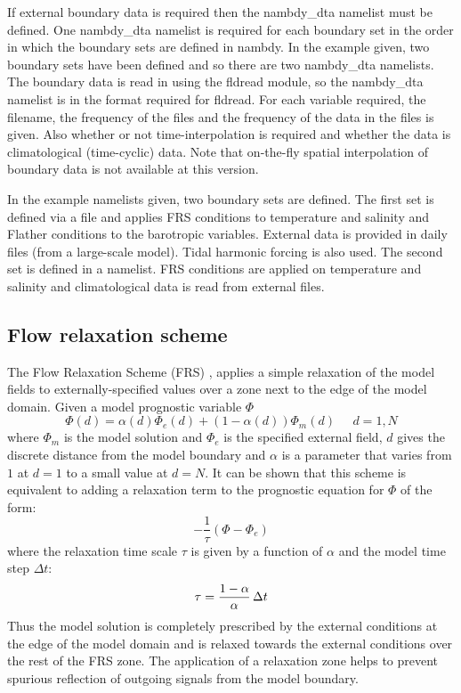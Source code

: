 \documentclass[../tex_main/NEMO_manual]{subfiles}
\begin{document}
If external boundary data is required then the nambdy\_dta namelist
must be defined. One nambdy\_dta namelist is required for each boundary
set in the order in which the boundary sets are defined in nambdy. In
the example given, two boundary sets have been defined and so there
are two nambdy\_dta namelists. The boundary data is read in using the
fldread module, so the nambdy\_dta namelist is in the format required
for fldread. For each variable required, the filename, the frequency
of the files and the frequency of the data in the files is given. Also
whether or not time-interpolation is required and whether the data is
climatological (time-cyclic) data. Note that on-the-fly spatial
interpolation of boundary data is not available at this version. 

In the example namelists given, two boundary sets are defined. The
first set is defined via a file and applies FRS conditions to
temperature and salinity and Flather conditions to the barotropic
variables. External data is provided in daily files (from a
large-scale model). Tidal harmonic forcing is also used. The second
set is defined in a namelist. FRS conditions are applied on
temperature and salinity and climatological data is read from external
files. 

\subsection{Flow relaxation scheme}
\label{subsec:BDY_FRS_scheme}

The Flow Relaxation Scheme (FRS) \citep{Davies_QJRMS76,Engerdahl_Tel95},
applies a simple relaxation of the model fields to
externally-specified values over a zone next to the edge of the model
domain. Given a model prognostic variable $\Phi$ 
\begin{equation}  \label{eq:bdy_frs1}
\Phi(d) = \alpha(d)\Phi_{e}(d) + (1-\alpha(d))\Phi_{m}(d)\;\;\;\;\; d=1,N
\end{equation}
where $\Phi_{m}$ is the model solution and $\Phi_{e}$ is the specified
external field, $d$ gives the discrete distance from the model
boundary  and $\alpha$ is a parameter that varies from $1$ at $d=1$ to
a small value at $d=N$. It can be shown that this scheme is equivalent
to adding a relaxation term to the prognostic equation for $\Phi$ of
the form:
\begin{equation}  \label{eq:bdy_frs2}
-\frac{1}{\tau}\left(\Phi - \Phi_{e}\right)
\end{equation}
where the relaxation time scale $\tau$ is given by a function of
$\alpha$ and the model time step $\Delta t$:
\begin{equation}  \label{eq:bdy_frs3}
\tau = \frac{1-\alpha}{\alpha}  \,\Delta t
\end{equation}
Thus the model solution is completely prescribed by the external
conditions at the edge of the model domain and is relaxed towards the
external conditions over the rest of the FRS zone. The application of
a relaxation zone helps to prevent spurious reflection of outgoing
signals from the model boundary. 
\end{document}

